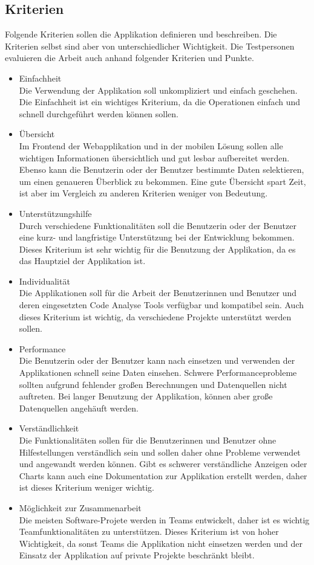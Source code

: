 \subsection{Kriterien} 
Folgende Kriterien sollen die Applikation definieren und beschreiben. Die Kriterien selbst sind aber von unterschiedlicher Wichtigkeit. Die Testpersonen evaluieren die Arbeit auch anhand folgender Kriterien und Punkte.
\begin{itemize}
\item Einfachheit \\ Die Verwendung der Applikation soll unkompliziert und einfach geschehen. Die Einfachheit ist ein wichtiges Kriterium, da die Operationen einfach und schnell durchgeführt werden können sollen.
\item Übersicht \\ Im Frontend der Webapplikation und in der mobilen Lösung sollen alle wichtigen Informationen übersichtlich und gut lesbar aufbereitet werden. Ebenso kann die Benutzerin oder der Benutzer bestimmte Daten selektieren, um einen genaueren Überblick zu bekommen. Eine gute Übersicht spart Zeit, ist aber im Vergleich zu anderen Kriterien weniger von Bedeutung.
\item Unterstützungshilfe \\ Durch verschiedene Funktionalitäten soll die Benutzerin oder der Benutzer eine kurz- und langfristige Unterstützung bei der Entwicklung bekommen. Dieses Kriterium ist sehr wichtig für die Benutzung der Applikation, da es das Hauptziel der Applikation ist.
\item Individualität \\ Die Applikationen soll für die Arbeit der Benutzerinnen und Benutzer und deren eingesetzten Code Analyse Tools verfügbar und kompatibel sein. Auch dieses Kriterium ist wichtig, da verschiedene Projekte unterstützt werden sollen.
\item Performance \\ Die Benutzerin oder der Benutzer kann nach einsetzen und verwenden der Applikationen schnell seine Daten einsehen. Schwere Performanceprobleme sollten aufgrund fehlender großen Berechnungen und Datenquellen nicht auftreten. Bei langer Benutzung der Applikation, können aber große Datenquellen angehäuft werden.
\item Verständlichkeit \\ Die Funktionalitäten sollen für die Benutzerinnen und Benutzer ohne Hilfestellungen verständlich sein und sollen daher ohne Probleme verwendet und angewandt werden können. Gibt es schwerer verständliche Anzeigen oder Charts kann auch eine Dokumentation zur Applikation erstellt werden, daher ist dieses Kriterium weniger wichtig.
\item Möglichkeit zur Zusammenarbeit \\
Die meisten Software-Projete werden in Teams entwickelt, daher ist es wichtig Teamfunktionalitäten zu unterstützen. Dieses Kriterium  ist von hoher Wichtigkeit, da sonst Teams die Applikation nicht einsetzen werden und der Einsatz der Applikation auf private Projekte beschränkt bleibt.
\end{itemize}

